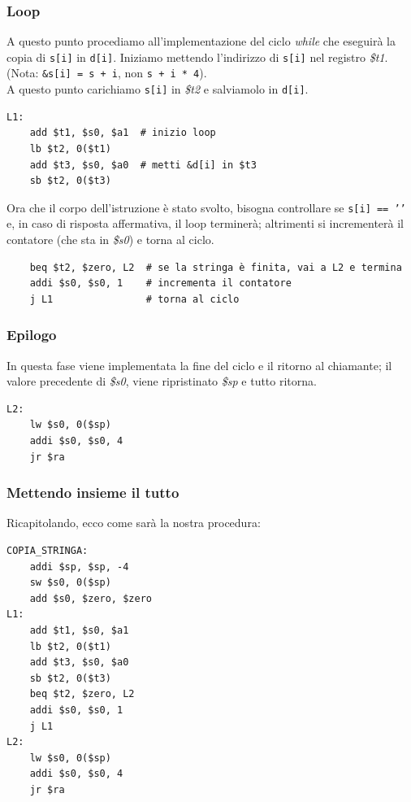 \documentclass[class=book, crop=false]{standalone}
\begin{document}
\subsubsection{Loop}
A questo punto procediamo all'implementazione del ciclo \emph{while} che eseguirà la copia di \texttt{s[i]} in \texttt{d[i]}. Iniziamo mettendo l'indirizzo di \texttt{s[i]} nel registro \emph{\$t1}.\\
(Nota: \texttt{&s[i] = s + i}, non \texttt{s + i * 4}).\\
A questo punto carichiamo \texttt{s[i]}
in \emph{\$t2} e salviamolo in \texttt{d[i]}.
\begin{verbatim}
L1:
	add $t1, $s0, $a1  # inizio loop
	lb $t2, 0($t1)
	add $t3, $s0, $a0  # metti &d[i] in $t3
	sb $t2, 0($t3)
\end{verbatim}
Ora che il corpo dell'istruzione è stato svolto, bisogna controllare se \texttt{s[i] == '\0'} e, in caso di risposta affermativa, il loop terminerà; altrimenti si incrementerà il contatore (che sta in \emph{\$s0}) e torna al ciclo.
\begin{verbatim}
	beq $t2, $zero, L2  # se la stringa è finita, vai a L2 e termina
	addi $s0, $s0, 1    # incrementa il contatore
	j L1                # torna al ciclo
\end{verbatim}

\subsubsection{Epilogo}
In questa fase viene implementata la fine del ciclo e il ritorno al chiamante; il valore precedente di \emph{\$s0}, viene ripristinato \emph{\$sp} e tutto ritorna.
\begin{verbatim}
L2:
	lw $s0, 0($sp)
	addi $s0, $s0, 4
	jr $ra
\end{verbatim}

\subsubsection{Mettendo insieme il tutto}
Ricapitolando, ecco come sarà la nostra procedura:
\begin{verbatim}
COPIA_STRINGA:
	addi $sp, $sp, -4
	sw $s0, 0($sp)
	add $s0, $zero, $zero
L1:
	add $t1, $s0, $a1
	lb $t2, 0($t1)
	add $t3, $s0, $a0
	sb $t2, 0($t3)
	beq $t2, $zero, L2
	addi $s0, $s0, 1
	j L1
L2:
	lw $s0, 0($sp)
	addi $s0, $s0, 4
	jr $ra
\end{verbatim}
\end{document}
